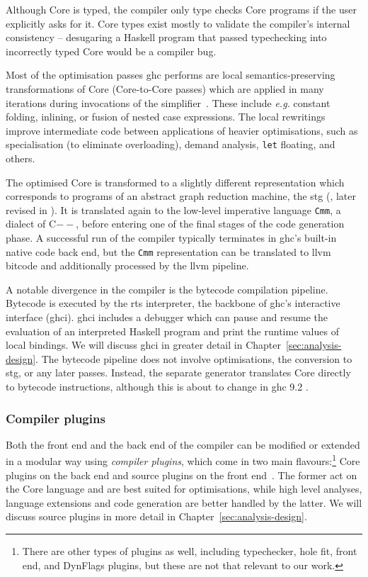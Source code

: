 \documentclass[thesis=B,english]{FITthesis}[2019/12/23]
\newcommand{\eg}{\emph{e.g.}\xspace}
\newcommand{\hsCode}[1]{\texttt{#1}}
\begin{document}
Although Core is typed, the compiler only type checks Core programs if the user
explicitly asks for it. Core types exist mostly to validate the compiler's
internal consistency -- desugaring a Haskell program that passed typechecking
into incorrectly typed Core would be a compiler bug.

Most of the optimisation passes \acrshort{ghc} performs are local
semantics-pre\-serv\-ing transformations of Core (Core-to-Core passes) which
are applied in many iterations during invocations of the
simplifier~\cite{cmtary-core2core}. These include \eg constant folding,
inlining, or fusion of nested case expressions. The local rewritings improve
intermediate code between applications of heavier optimisations, such as
specialisation (to eliminate overloading), demand analysis, \hsCode{let}
floating, and others.

The optimised Core is transformed to a slightly different representation which
corresponds to programs of an abstract graph reduction machine, the
\acrfull{stg} (\cite{stg-classic}, later revised in \cite{stg2}). It is
translated again to the low-level imperative language \texttt{Cmm}, a dialect
of C$--$, before entering one of the final stages of the code generation phase.
A successful run of the compiler typically terminates in \acrshort{ghc}'s
built-in native code back end, but the \texttt{Cmm} representation can be
translated to \acrshort{llvm} bitcode and additionally processed by the
\acrshort{llvm} pipeline.

A notable divergence in the compiler is the bytecode compilation pipeline.
Bytecode is executed by the \acrshort{rts} interpreter, the backbone of
\acrshort{ghc}'s interactive interface (\acrshort{ghci}). \acrshort{ghci}
includes a debugger which can pause and resume the evaluation of an interpreted
Haskell program and print the runtime values of local bindings. We will discuss
\acrshort{ghci} in greater detail in Chapter~\ref{sec:analysis-design}. The
bytecode pipeline does not involve optimisations, the conversion to
\acrshort{stg}, or any later passes. Instead, the separate generator translates
Core directly to bytecode instructions, although this is about to change in
\acrshort{ghc} 9.2 \cite{mr-ghci-stg-unboxed}.

\subsubsection*{Compiler plugins}
Both the front end and the back end of the compiler can be modified or extended
in a modular way using \textit{compiler plugins}, which come in two main
flavours:\footnote{
	There are other types of plugins as well, including typechecker, hole fit,
	front end, and DynFlags plugins, but these are not that relevant to our
	work.
} Core plugins on the back end and source plugins on the front
end~\cite{ghc-source-plugins}. The former act on the Core language and are best
suited for optimisations, while high level analyses, language extensions and
code generation are better handled by the latter. We will discuss source
plugins in more detail in Chapter~\ref{sec:analysis-design}.
\end{document}
